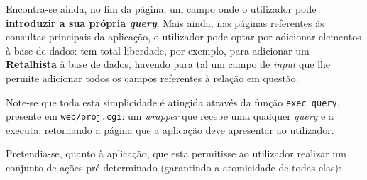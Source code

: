\documentclass[12pt,a4paper]{article}
\begin{document}
  Encontra-se ainda, no fim da página, um campo onde o utilizador pode \textbf{introduzir a sua própria \textit{query}}.
  Mais ainda, nas páginas referentes às consultas principais da aplicação,
  o utilizador pode optar por adicionar elementos à base de dados: tem total
  liberdade, por exemplo, para adicionar um \textbf{Retalhista} à base de dados,
  havendo para tal um campo de \textit{input} que lhe permite adicionar todos os
  campos referentes à relação em questão.

  Note-se que toda esta simplicidade é atingida através da função \texttt{exec\_query},
  presente em \texttt{web/proj.cgi}: um \textit{wrapper} que recebe uma qualquer
  \textit{query} e a executa, retornando a página que a aplicação deve apresentar
  ao utilizador.

  \vspace*{0.5cm}

  Pretendia-se, quanto à aplicação, que esta permitisse ao utilizador realizar um conjunto
  de ações pré-determinado (garantindo a atomicidade de todas elas):
\end{document}
